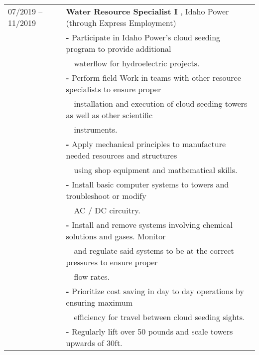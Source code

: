 \documentclass[a4paper,12pt]{article}
\begin{document}
\begin{tabular}{ll}
07/2019 -- 11/2019 & \textbf{Water Resource Specialist I }, Idaho Power (through Express Employment)\\
         & \textbf{-} Participate in Idaho Power’s cloud seeding program to provide additional\\
         & \-\ \-\ waterflow for hydroelectric projects.\\
         & \textbf{-} Perform field Work in teams with other resource specialists to ensure proper\\
         & \-\ \-\ installation and execution of cloud seeding towers as well as other scientific\\
         & \-\ \-\ instruments.\\
         & \textbf{-} Apply mechanical principles to manufacture needed resources and structures\\ 
         & \-\ \-\ using shop equipment and mathematical skills.\\ 
         & \textbf{-} Install basic computer systems to towers and troubleshoot or modify\\ 
         & \-\ \-\ AC / DC circuitry. \\
         & \textbf{-} Install and remove systems involving chemical solutions and gases. Monitor \\
         & \-\ \-\ and regulate said systems to be at the correct pressures to ensure proper\\ 
         & \-\ \-\ flow rates. \\
         & \textbf{-} Prioritize cost saving in day to day operations by ensuring maximum\\
         & \-\ \-\ efficiency for travel between cloud seeding sights. \\
         & \textbf{-} Regularly lift over 50 pounds and scale towers upwards of 30ft.
         \\
\end{tabular}
\end{document}
